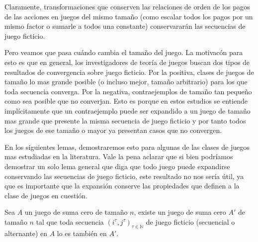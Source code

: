 Claramente, transformaciones que conserven las relaciones de orden de los pagos de las acciones en juegos del mismo tamaño (como escalar todos los pagos por un mismo factor o sumarle a todos una constante) conservararán las secuencias de juego ficticio.

Pero veamos que pasa cuándo cambia el tamaño del juego. La motivacón para esto es que en general, los investigadores de teoría de juegos buscan dos tipos de resultados de convergencia sobre juego ficticio. Por la positiva, clases de juegos de tamaño lo mas grande posible (o incluso mejor, tamaño arbitrario) para los que toda secuencia converga. Por la negativa, contraejemplos de tamaño tan pequeño como sea posible que no converjan. Esto es porque en estos estudios se entiende implícitamente que un contraejemplo puede ser expandido a un juego de tamaño mas grande que presente la misma secuencia de juego ficticio y por tanto todos los juegos de ese tamaño o mayor ya presentan casos que no convergen.

En los siguientes lemas, demostraremos esto para algunas de las clases de juegos mas estudiadas en la literatura. Vale la pena aclarar que si bien podríamos demostrar un solo lema general que diga que todo juego puede expandirse conservando las secuencias de juego ficticio, este resultado no nos sería útil, ya que es importante que la expansión conserve las propiedades que definen a la clase de juegos en cuestión.

\begin{lemma}
    Sea $A$ un juego de suma cero de tamaño $n$, existe un juego  de suma cero $A'$ de tamaño $n$ tal que toda secuencia $(i^\tau, j^\tau)_{\tau \in \mathbb{N}}$ de juego ficticio (secuencial o alternante) en $A$ lo es también en $A'$.
\end{lemma}

